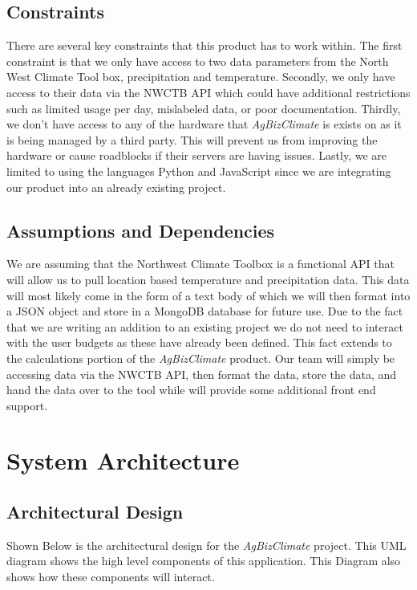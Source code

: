 \documentclass[onecolumn, draftclsnofoot,10pt, compsoc]{article}
\begin{document}
	\subsection{Constraints}
		There are several key constraints that this product has to work within. The first constraint is that we only have access to two data parameters from the North West Climate Tool box, precipitation and temperature. Secondly, we only have access to their data via the NWCTB API which could have additional restrictions such as limited usage per day, mislabeled data, or poor documentation. Thirdly, we don’t have access to any of the hardware that \textit{AgBizClimate} is exists on as it is being managed by a third party. This will prevent us from improving the hardware or cause roadblocks if their servers are having issues. Lastly, we are limited to using the languages Python and JavaScript since we are integrating our product into an already existing project.\\

	\subsection {Assumptions and Dependencies}
		We are assuming that the Northwest Climate Toolbox is a functional API that will allow us to pull location based temperature and precipitation data. This data will most likely come in the form of a text body of which we will then format into a JSON object and store in a MongoDB database for future use. Due to the fact that we are writing an addition to an existing project we do not need to interact with the user budgets as these have already been defined. This fact extends to the calculations portion of the \textit{AgBizClimate} product. Our team will simply be accessing data via the NWCTB API, then format the data, store the data, and hand the data over to the tool while will provide some additional front end support.\\


\section{System Architecture}
	\subsection{Architectural Design}
		Shown Below is the architectural design for the \textit{AgBizClimate} project. This UML diagram shows the high level components of this application. This Diagram also shows how these components will interact.\\
\end{document}
